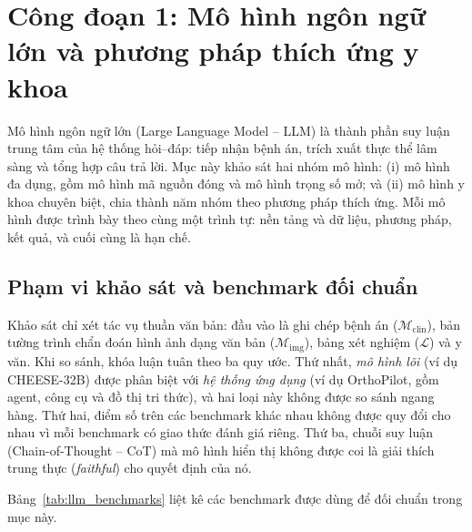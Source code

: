 \section{Công đoạn 1: Mô hình ngôn ngữ lớn và phương pháp thích ứng y khoa}
\label{sec:chap2_llm_survey}

Mô hình ngôn ngữ lớn (Large Language Model -- LLM) là thành phần suy luận trung tâm của hệ thống hỏi--đáp: tiếp nhận bệnh án, trích xuất thực thể lâm sàng và tổng hợp câu trả lời. Mục này khảo sát hai nhóm mô hình: (i) mô hình đa dụng, gồm mô hình mã nguồn đóng và mô hình trọng số mở; và (ii) mô hình y khoa chuyên biệt, chia thành năm nhóm theo phương pháp thích ứng. Mỗi mô hình được trình bày theo cùng một trình tự: nền tảng và dữ liệu, phương pháp, kết quả, và cuối cùng là hạn chế.

\subsection{Phạm vi khảo sát và benchmark đối chuẩn}

Khảo sát chỉ xét tác vụ thuần văn bản: đầu vào là ghi chép bệnh án ($\mathcal{M}_{\mathrm{clin}}$), bản tường trình chẩn đoán hình ảnh dạng văn bản ($\mathcal{M}_{\mathrm{img}}$), bảng xét nghiệm ($\mathcal{L}$) và y văn. Khi so sánh, khóa luận tuân theo ba quy ước. Thứ nhất, \emph{mô hình lõi} (ví dụ CHEESE-32B) được phân biệt với \emph{hệ thống ứng dụng} (ví dụ OrthoPilot, gồm agent, công cụ và đồ thị tri thức), và hai loại này không được so sánh ngang hàng. Thứ hai, điểm số trên các benchmark khác nhau không được quy đổi cho nhau vì mỗi benchmark có giao thức đánh giá riêng. Thứ ba, chuỗi suy luận (Chain-of-Thought -- CoT) mà mô hình hiển thị không được coi là giải thích trung thực (\emph{faithful}) cho quyết định của nó.

Bảng~\ref{tab:llm_benchmarks} liệt kê các benchmark được dùng để đối chuẩn trong mục này.

